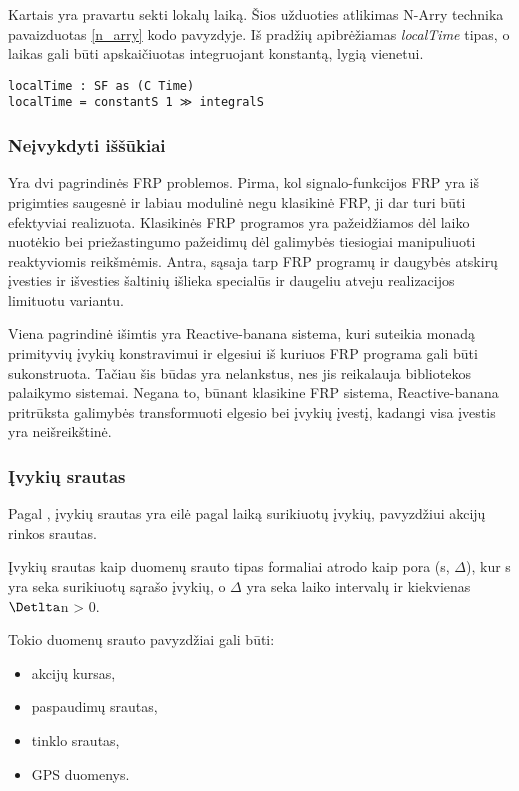 Kartais yra pravartu sekti lokalų laiką. Šios užduoties atlikimas N-Arry technika pavaizduotas \ref{n_arry} kodo pavyzdyje. Iš pradžių apibrėžiamas \textit{localTime} tipas, o laikas gali būti apskaičiuotas integruojant konstantą, lygią vienetui.

\begin{lstlisting}[caption=- N-Arry demonstracija, label=n_arry]
localTime : SF as (C Time)
localTime = constantS 1 ≫ integralS
\end{lstlisting}

\subsubsection{Neįvykdyti iššūkiai}

Yra dvi pagrindinės FRP problemos. Pirma, kol signalo-funkcijos FRP yra iš prigimties saugesnė ir labiau modulinė negu klasikinė FRP, ji dar turi būti efektyviai realizuota. Klasikinės FRP programos yra pažeidžiamos dėl laiko nuotėkio bei priežastingumo pažeidimų dėl galimybės tiesiogiai manipuliuoti reaktyviomis reikšmėmis. Antra, sąsaja tarp FRP programų ir daugybės atskirų įvesties ir išvesties šaltinių išlieka specialūs ir daugeliu atveju realizacijos limituotu variantu.

Viena pagrindinė išimtis yra Reactive-banana sistema, kuri suteikia monadą primityvių įvykių konstravimui ir elgesiui iš kuriuos FRP programa gali būti sukonstruota. Tačiau šis būdas yra nelankstus, nes jis reikalauja bibliotekos palaikymo sistemai. Negana to, būnant klasikine FRP sistema, Reactive-banana pritrūksta galimybės transformuoti elgesio bei įvykių įvestį, kadangi visa įvestis yra neišreikštinė.

\subsubsection{Įvykių srautas}

Pagal \cite{Bass:2007:Mythbusters}, įvykių srautas yra eilė pagal laiką surikiuotų įvykių, pavyzdžiui akcijų rinkos srautas.

Įvykių srautas kaip duomenų srauto tipas formaliai atrodo kaip pora (s, $\Delta$), kur s yra seka surikiuotų sąrašo įvykių, o $\Delta$ yra seka laiko intervalų ir kiekvienas $\Detlta$n > 0.

Tokio duomenų srauto pavyzdžiai gali būti:

\begin{itemize}

	\item akcijų kursas,

	\item paspaudimų srautas,

	\item tinklo srautas,

	\item GPS duomenys.

\end{itemize}

